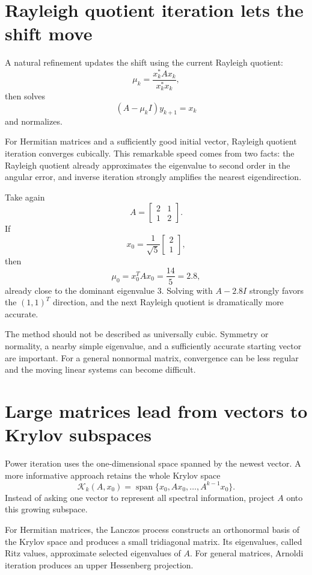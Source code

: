 \section{Rayleigh quotient iteration lets the shift move}

A natural refinement updates the shift using the current Rayleigh quotient:
\[
  \mu_k=\frac{x_k^*Ax_k}{x_k^*x_k},
\]
then solves
\[
  (A-\mu_kI)y_{k+1}=x_k
\]
and normalizes.

For Hermitian matrices and a sufficiently good initial vector, Rayleigh quotient iteration converges cubically.  This remarkable speed comes from two facts: the Rayleigh quotient already approximates the eigenvalue to second order in the angular error, and inverse iteration strongly amplifies the nearest eigendirection.

Take again
\[
  A=
  \begin{bmatrix}
    2&1\\
    1&2
  \end{bmatrix}.
\]
If
\[
  x_0=\frac1{\sqrt5}
  \begin{bmatrix}2\\1\end{bmatrix},
\]
then
\[
  \mu_0=x_0^TAx_0=\frac{14}{5}=2.8,
\]
already close to the dominant eigenvalue \(3\).  Solving with \(A-2.8I\) strongly favors the \((1,1)^T\) direction, and the next Rayleigh quotient is dramatically more accurate.

The method should not be described as universally cubic.  Symmetry or normality, a nearby simple eigenvalue, and a sufficiently accurate starting vector are important.  For a general nonnormal matrix, convergence can be less regular and the moving linear systems can become difficult.

\section{Large matrices lead from vectors to Krylov subspaces}

Power iteration uses the one-dimensional space spanned by the newest vector.  A more informative approach retains the whole Krylov space
\[
  \mathcal K_k(A,x_0)
  =\operatorname{span}
  \{x_0,Ax_0,\ldots,A^{k-1}x_0\}.
\]
Instead of asking one vector to represent all spectral information, project \(A\) onto this growing subspace.

For Hermitian matrices, the Lanczos process constructs an orthonormal basis of the Krylov space and produces a small tridiagonal matrix.  Its eigenvalues, called Ritz values, approximate selected eigenvalues of \(A\).  For general matrices, Arnoldi iteration produces an upper Hessenberg projection.


